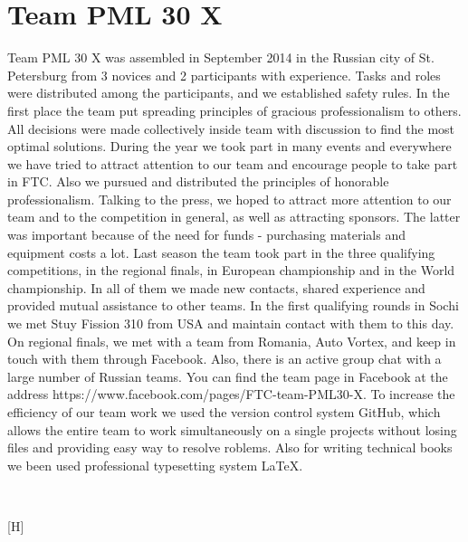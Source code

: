 
\section{Team PML 30 X} 
	Team PML 30 X was assembled in September 2014 in the Russian city of St. Petersburg from 3 novices and 2 participants with experience. Tasks and roles were distributed among the participants, and we established safety rules. In the first place the team put spreading principles of gracious professionalism to others. All decisions were made collectively inside team with discussion to find the most optimal solutions. 
	During the year we took part in many events and everywhere we have tried to attract attention to our team and encourage people to take part in FTC. Also we pursued and distributed the principles of honorable professionalism. Talking to the press, we hoped to attract more attention to our team and to the competition in general, as well as attracting sponsors. The latter was important because of the need for funds - purchasing materials and equipment costs a lot.
	Last season the team took part in the three qualifying competitions, in the regional finals, in European championship and in the World championship. In all of them we made new contacts, shared experience and provided mutual assistance to other teams. In the first qualifying rounds in Sochi we met Stuy Fission 310 from USA and maintain contact with them to this day. On regional finals, we met with a team from Romania, Auto Vortex, and keep in touch with them through Facebook. Also, there is an active group chat with a large number of Russian teams. You can find the team page in Facebook at the address https://www.facebook.com/pages/FTC-team-PML30-X.
	To increase the efficiency of our team work we used the version control system GitHub, which allows the entire team to work simultaneously on a single projects without losing files and providing easy way to resolve roblems. Also for writing technical books we been used professional typesetting system LaTeX.
	\begin{figure}[H]
		\\
	\end{figure}[H]
\fillpage

